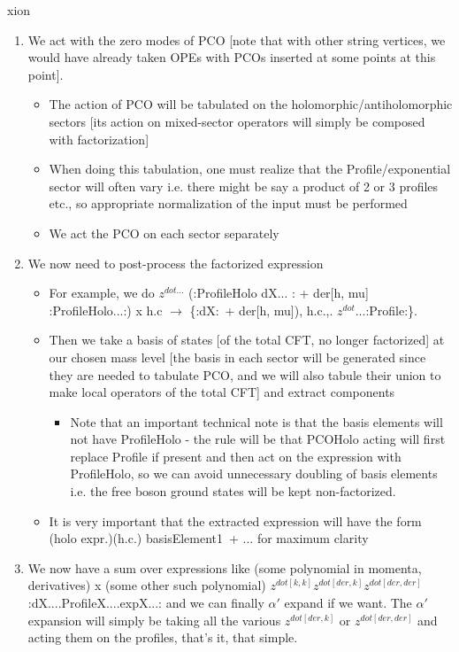 xion\documentclass[12pt]{article}
\numberwithin{equation}{section}
\begin{document}
\begin{enumerate}
\item We act with the zero modes of PCO [note that with other string vertices, we would have already taken OPEs with PCOs inserted at some points at this point].
	\begin{itemize}
		\item The action of PCO will be tabulated on the holomorphic/antiholomorphic sectors [its action on mixed-sector operators will simply be composed with factorization]
		\item When doing this tabulation, one must realize that the Profile/exponential sector will often vary i.e. there might be say a product of 2 or 3 profiles etc., so appropriate normalization of the input must be performed
		\item We act the PCO on each sector separately
	\end{itemize}
\item We now need to post-process the factorized expression
	\begin{itemize}
		\item For example, we do $z^{dot...}$ (:ProfileHolo dX... : + der[h, mu] :ProfileHolo...:) x h.c $\rightarrow$ \{:dX: + der[h, mu]), h.c.,. $z^{dot}$...:Profile:\}.
		\item Then we take a basis of states [of the total CFT, no longer factorized] at our chosen mass level [the basis in each sector will be generated since they are needed to tabulate PCO, and we will also tabule their union to make local operators of the total CFT] and extract components
			\begin{itemize}
				\item Note that an important technical note is that the basis elements will not have ProfileHolo - the rule will be that PCOHolo acting will first replace Profile if present and then act on the expression with ProfileHolo, so we can avoid unnecessary doubling of basis elements i.e. the free boson ground states will be kept non-factorized.
			\end{itemize}
\item It is very important that the extracted expression will have the form (holo expr.)(h.c.) basisElement1 + ... for maximum clarity
\end{itemize}
\item We now have a sum over expressions like (some polynomial in momenta, derivatives) x (some other such polynomial) $z^{dot[k,k]} z^{dot[der, k]} z^{dot[der,der]}$ :dX....ProfileX....expX...: and we can finally $\alpha'$ expand if we want. The $\alpha'$ expansion will simply be taking all the various $z^{dot[der,k]}$ or $z^{dot[der,der]}$ and acting them on the profiles, that's it, that simple.

\end{enumerate}
\end{document}
